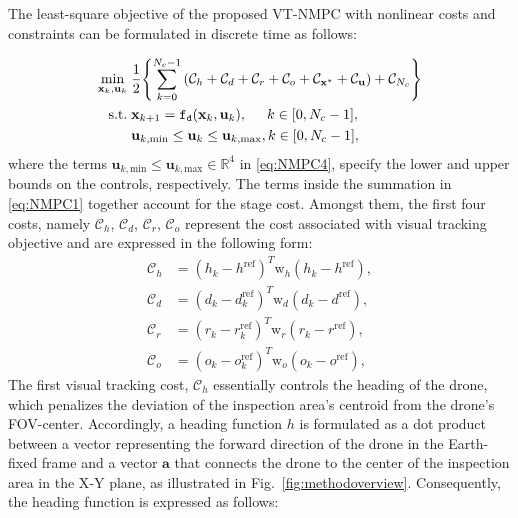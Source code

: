 \documentclass[letterpaper, 10 pt, conference]{ieeeconf}  %
\DeclareMathOperator*{\minimize}{{min}}
\begin{document}
The least-square objective of the proposed \ac{VT-NMPC} with nonlinear costs and constraints can be formulated in discrete time as follows:

%
\begin{subequations} \label{eq:NMPC}
\begin{align}
	\minimize_{\mathbf{x}_k,\mathbf{u}_k} \; & \frac{1}{2} \Biggl\{\sum_{k = 0}^{N_c-1} \left( \mathcal{C}_{h}
	+\mathcal{C}_{{d}} +\mathcal{C}_{{r}} + \mathcal{C}_{{o}} + \mathcal{C}_{\mathbf{x}^*}+ \mathcal{C}_{\mathbf{u}}\right) + \mathcal{C}_{N_c} 
	\Biggr\} \label{eq:NMPC1} \\
	\textrm{s.t.} \; & \mathbf{x}_{k+1} = \mathtt{f_d}(\mathbf{x}_k,\mathbf{u}_k), \hspace{0.5cm} k \in [0, N_c-1],  \label{eq:NMPC2} \\
    & \mathbf{u}_{k,\textrm{min}} \leq \mathbf{u}_k \leq \mathbf{u}_{k,\textrm{max}}, k \in [0, N_c-1], \label{eq:NMPC4}
\end{align}
\end{subequations}
%
where the terms $\mathbf{u}_{k,\textrm{min}} \leq \mathbf{u}_{k,\textrm{max}} \in \mathbb{R}^{4}$ in \eqref{eq:NMPC4}, specify the lower and upper bounds on the controls, respectively. The terms inside the summation in \eqref{eq:NMPC1} together account for the stage cost. Amongst them, the first four costs, namely $\mathcal{C}_{h}$, $\mathcal{C}_{d}$, $\mathcal{C}_{r}$, $\mathcal{C}_{o}$ represent the cost associated with visual tracking objective and are expressed in the following form: 
%
\begin{align} 
	\mathcal{C}_{h} &= (h_k - h^{\textrm{ref}})^T\mathrm{w}_{h}(h_k - h^\textrm{ref}), \label{eq:NMPC1_stageCostVisual_head} \\
	\mathcal{C}_{d} &= (d_k - d_k^{\textrm{ref}})^T\mathrm{w}_{d}(d_k - d^{\textrm{ref}}),  \label{eq:NMPC1_stageCostVisual_dist} 
	\\
	\mathcal{C}_{r} &= (r_k - r_k^{\textrm{ref}})^T\mathrm{w}_{r}(r_k - r^{\textrm{ref}}),  \label{eq:NMPC1_stageCostVisual_roi}
	\\
	\mathcal{C}_{o} &= (o_k - o_k^{\textrm{ref}})^T\mathrm{w}_{o}(o_k - o^{\textrm{ref}}),  \label{eq:NMPC1_stageCostVisual_oi}
\end{align}
%
The first visual tracking cost, $\mathcal{C}_{h}$ essentially controls the heading of the drone, which penalizes the deviation of the inspection area's centroid from the drone's \ac{FOV}-center. Accordingly, a heading function $h$ is formulated as a dot product between a vector representing the forward direction of the drone in the Earth-fixed frame and a vector $\mathbf{a}$ that connects the drone to the center of the inspection area in the X-Y plane, as illustrated in Fig.~\ref{fig:methodoverview}. Consequently, the heading function is expressed as follows:
\end{document}
